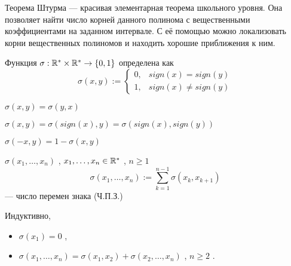 



    
\SScover
    

Теорема Штурма --- красивая элементарная теорема школьного уровня. Она позволяет найти число корней данного полинома с вещественными коэффициентами на заданном интервале.
С её помощью можно локализовать корни вещественных полиномов и находить хорошие приближения к ним.

\vspace

\SSbullet 


\SSsect[def] Функция \( \sigma: \mathbb{R}^* \times \mathbb{R}^* \rightarrow \{0,1\} \) определена как
\[ \sigma(x,y) := 
   \begin{cases} 
       0, & sign(x) = sign(y) \\ 
       1, & sign(x) \neq sign(y)
   \end{cases} 
\]

\SSsect \( \sigma(x,y) = \sigma(y,x) \)

\SSsect \( \sigma(x,y) = \sigma(sign(x),y) = \sigma(sign(x),sign(y)) \)

\SSsect \( \sigma(-x,y) = 1 - \sigma(x,y) \)

\SSsect[def] \( \sigma(x_1,\dots,x_n) \) , \( x_1,\dots,x_n \in \mathbb{R}^* \) , \( n \geqslant 1 \)
\[ \sigma(x_1,\dots,x_n) := \sum_{k=1}^{n-1} \sigma(x_k,x_{k+1})
\]
--- число перемен знака (Ч.П.З.)

\SSsect Индуктивно,
\begin{itemize}[label=]
\item \( \sigma(x_1) = 0 \) ,
\item \( \sigma(x_1,\dots,x_n) = \sigma(x_1,x_2) + \sigma(x_2,\dots,x_n) \) , \( n \geqslant 2 \) .
\end{itemize}

